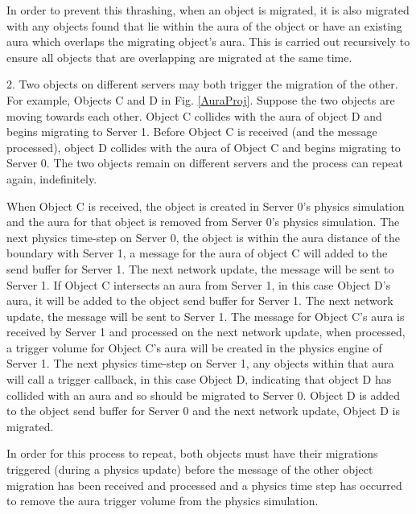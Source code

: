 In order to prevent this thrashing, when an object is migrated, it is also migrated with any objects found that lie within the aura of the object or have an existing aura which overlaps the migrating object's aura. This is carried out recursively to ensure all objects that are overlapping are migrated at the same time.

2. Two objects on different servers may both trigger the migration of the other. For example, Objects C and D in Fig. \ref{AuraProj}. Suppose the two objects are moving towards each other. Object C collides with the aura of object D and begins migrating to Server 1. Before Object C is received (and the message processed), object D collides with the aura of Object C and begins migrating to Server 0. The two objects remain on different servers and the process can repeat again, indefinitely.

When Object C is received, the object is created in Server 0's physics simulation and the aura for that object is removed from Server 0's physics simulation. 
The next physics time-step on Server 0, the object is within the aura distance of the boundary with Server 1, a message for the aura of object C will added to the send buffer for Server 1. The next network update, the message will be sent to Server 1.
If Object C intersects an aura from Server 1, in this case Object D's aura, it will be added to the object send buffer for Server 1. The next network update, the message will be sent to Server 1. %
The message for Object C's aura is received by Server 1 and processed on the next network update, when processed, a trigger volume for Object C's aura will be created in the physics engine of Server 1. The next physics time-step on Server 1, any objects within that aura will call a trigger callback, in this case Object D, indicating that object D has collided with an aura and so should be migrated to Server 0. Object D is added to the object send buffer for Server 0 and the next network update, Object D is migrated.



In order for this process to repeat, both objects must have their migrations triggered (during a physics update) before the message of the other object migration has been received and processed and a physics time step has occurred to remove the aura trigger volume from the physics simulation.

